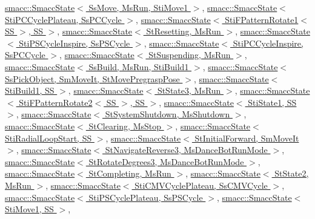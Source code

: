 \hyperlink{classsmacc_1_1SmaccState_afc39f8e0ca4001b2159a100da2fccd0e}{smacc\+::\+Smacc\+State$<$ Ss\+Move, Ms\+Run, Sti\+Move1 $>$}, \hyperlink{classsmacc_1_1SmaccState_afc39f8e0ca4001b2159a100da2fccd0e}{smacc\+::\+Smacc\+State$<$ Sti\+P\+C\+Cycle\+Plateau, Ss\+P\+C\+Cycle $>$}, \hyperlink{classsmacc_1_1SmaccState_afc39f8e0ca4001b2159a100da2fccd0e}{smacc\+::\+Smacc\+State$<$ Sti\+F\+Pattern\+Rotate1$<$ S\+S $>$, S\+S $>$}, \hyperlink{classsmacc_1_1SmaccState_afc39f8e0ca4001b2159a100da2fccd0e}{smacc\+::\+Smacc\+State$<$ St\+Resetting, Ms\+Run $>$}, \hyperlink{classsmacc_1_1SmaccState_afc39f8e0ca4001b2159a100da2fccd0e}{smacc\+::\+Smacc\+State$<$ Sti\+P\+S\+Cycle\+Inspire, Ss\+P\+S\+Cycle $>$}, \hyperlink{classsmacc_1_1SmaccState_afc39f8e0ca4001b2159a100da2fccd0e}{smacc\+::\+Smacc\+State$<$ Sti\+P\+C\+Cycle\+Inspire, Ss\+P\+C\+Cycle $>$}, \hyperlink{classsmacc_1_1SmaccState_afc39f8e0ca4001b2159a100da2fccd0e}{smacc\+::\+Smacc\+State$<$ St\+Suspending, Ms\+Run $>$}, \hyperlink{classsmacc_1_1SmaccState_afc39f8e0ca4001b2159a100da2fccd0e}{smacc\+::\+Smacc\+State$<$ Ss\+Build, Ms\+Run, Sti\+Build1 $>$}, \hyperlink{classsmacc_1_1SmaccState_afc39f8e0ca4001b2159a100da2fccd0e}{smacc\+::\+Smacc\+State$<$ Ss\+Pick\+Object, Sm\+Move\+It, St\+Move\+Pregrasp\+Pose $>$}, \hyperlink{classsmacc_1_1SmaccState_afc39f8e0ca4001b2159a100da2fccd0e}{smacc\+::\+Smacc\+State$<$ Sti\+Build1, S\+S $>$}, \hyperlink{classsmacc_1_1SmaccState_afc39f8e0ca4001b2159a100da2fccd0e}{smacc\+::\+Smacc\+State$<$ St\+State3, Ms\+Run $>$}, \hyperlink{classsmacc_1_1SmaccState_afc39f8e0ca4001b2159a100da2fccd0e}{smacc\+::\+Smacc\+State$<$ Sti\+F\+Pattern\+Rotate2$<$ S\+S $>$, S\+S $>$}, \hyperlink{classsmacc_1_1SmaccState_afc39f8e0ca4001b2159a100da2fccd0e}{smacc\+::\+Smacc\+State$<$ Sti\+State1, S\+S $>$}, \hyperlink{classsmacc_1_1SmaccState_afc39f8e0ca4001b2159a100da2fccd0e}{smacc\+::\+Smacc\+State$<$ St\+System\+Shutdown, Ms\+Shutdown $>$}, \hyperlink{classsmacc_1_1SmaccState_afc39f8e0ca4001b2159a100da2fccd0e}{smacc\+::\+Smacc\+State$<$ St\+Clearing, Ms\+Stop $>$}, \hyperlink{classsmacc_1_1SmaccState_afc39f8e0ca4001b2159a100da2fccd0e}{smacc\+::\+Smacc\+State$<$ Sti\+Radial\+Loop\+Start, S\+S $>$}, \hyperlink{classsmacc_1_1SmaccState_afc39f8e0ca4001b2159a100da2fccd0e}{smacc\+::\+Smacc\+State$<$ St\+Initial\+Forward, Sm\+Move\+It $>$}, \hyperlink{classsmacc_1_1SmaccState_afc39f8e0ca4001b2159a100da2fccd0e}{smacc\+::\+Smacc\+State$<$ St\+Navigate\+Reverse3, Ms\+Dance\+Bot\+Run\+Mode $>$}, \hyperlink{classsmacc_1_1SmaccState_afc39f8e0ca4001b2159a100da2fccd0e}{smacc\+::\+Smacc\+State$<$ St\+Rotate\+Degrees3, Ms\+Dance\+Bot\+Run\+Mode $>$}, \hyperlink{classsmacc_1_1SmaccState_afc39f8e0ca4001b2159a100da2fccd0e}{smacc\+::\+Smacc\+State$<$ St\+Completing, Ms\+Run $>$}, \hyperlink{classsmacc_1_1SmaccState_afc39f8e0ca4001b2159a100da2fccd0e}{smacc\+::\+Smacc\+State$<$ St\+State2, Ms\+Run $>$}, \hyperlink{classsmacc_1_1SmaccState_afc39f8e0ca4001b2159a100da2fccd0e}{smacc\+::\+Smacc\+State$<$ Sti\+C\+M\+V\+Cycle\+Plateau, Ss\+C\+M\+V\+Cycle $>$}, \hyperlink{classsmacc_1_1SmaccState_afc39f8e0ca4001b2159a100da2fccd0e}{smacc\+::\+Smacc\+State$<$ Sti\+P\+S\+Cycle\+Plateau, Ss\+P\+S\+Cycle $>$}, \hyperlink{classsmacc_1_1SmaccState_afc39f8e0ca4001b2159a100da2fccd0e}{smacc\+::\+Smacc\+State$<$ Sti\+Move1, S\+S $>$}, 